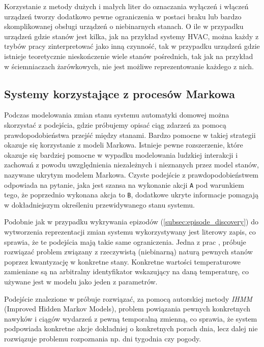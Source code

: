 Korzystanie z metody dużych i małych liter do oznaczania wyłączeń i włączeń urządzeń tworzy dodatkowo pewne ograniczenia w postaci braku lub bardzo skomplikowanej obsługi urządzeń o niebinarnych stanach. O ile w przypadku urządzeń gdzie stanów jest kilka, jak na przykład systemy HVAC, można każdy z trybów pracy zinterpretować jako inną czynność, tak w przypadku urządzeń gdzie istnieje teoretycznie nieskończenie wiele stanów pośrednich, tak jak na przykład w ściemniaczach żarówkowych, nie jest możliwe reprezentowanie każdego z nich.

\subsection{Systemy korzystające z procesów Markowa}
Podczas modelowania zmian stanu systemu automatyki domowej można skorzystać z podejścia, gdzie próbujemy opisać ciąg zdarzeń za pomocą prawdopodobieństwa przejść między stanami. Bardzo pomocne w takiej strategii okazuje się korzystanie z modeli Markowa. Istnieje pewne rozszerzenie, które okazuje się bardziej pomocne w wypadku modelowania ludzkiej interakcji i zachowań z powodu uwzględnienia niezależnych i nieznanych przez model stanów, nazywane ukrytym modelem Markowa. Czyste podejście z prawdopodobieństwem odpowiada na pytanie, jaka jest szansa na wykonanie akcji \verb+A+ pod warunkiem tego, że poprzednio wykonana akcja to \verb+B+, dodatkowe ukryte informacje pomagają w dokładniejszym określeniu przewidywanego stanu systemu.

Podobnie jak w przypadku wykrywania epizodów (\ref{subsec:episode_discovery}) do wytworzenia reprezentacji zmian systemu wykorzystywany jest literowy zapis, co sprawia, że te podejścia mają takie same ograniczenia. Jedna z prac \cite{markov_1}, próbuje rozwiązać problem związany z rzeczywistą (niebinarną) naturą pewnych stanów poprzez kwantyzację w konkretne stany. Konkretne wartości temperaturowe zamieniane są na arbitralny identyfikator wskazujący na daną temperaturę, co używane jest w modelu jako jeden z parametrów.

Podejście znalezione w \cite{markov_1} próbuje rozwiązać, za pomocą autorskiej metody \textit{IHMM} (Improved Hidden Markov Models), problem powiązania pewnych konkretnych nawyków i ciągów wydarzeń z pewną temporalną zmienną, co sprawia, że system podpowiada konkretne akcje dokładniej o konkretnych porach dnia, lecz dalej nie rozwiązuje problemu rozpoznania np. dni tygodnia czy pogody.

